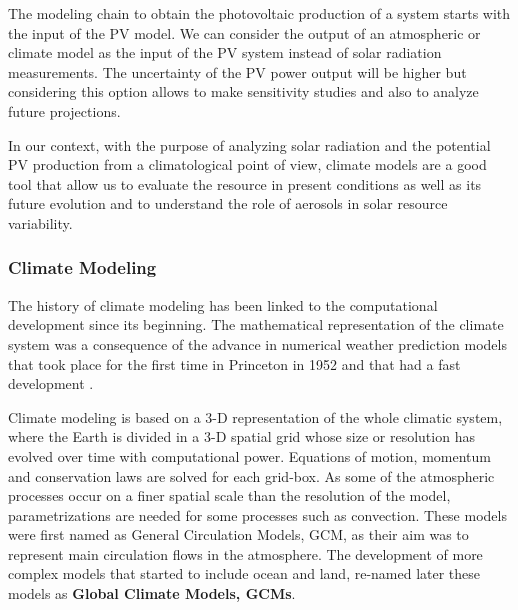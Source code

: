 The modeling chain to obtain the photovoltaic production of a system starts with the input of the PV model. We can consider the output of an atmospheric or climate model as the input of the PV system instead of solar radiation measurements. The uncertainty of the PV power output will be higher but considering this option allows to make sensitivity studies and also to analyze future projections.
 

In our context, with the purpose of analyzing solar radiation and the potential PV production from a climatological point of view, climate models are a good tool that allow us to evaluate the resource in present conditions as well as its future evolution and to understand the role of aerosols in solar resource variability.

\subsubsection{Climate Modeling}

The history of climate modeling has been linked to the computational development since its beginning. The mathematical representation of the climate system was a consequence of the advance in numerical weather prediction models that took place for the first time in Princeton in 1952 and that had a fast development \cite*{Edwards2011}. %

Climate modeling is based on a 3-D representation of the whole climatic system, where the Earth is divided  in a 3-D spatial grid whose size or resolution has evolved over time with computational power. Equations of motion, momentum and conservation laws are solved for each grid-box. As some of the atmospheric processes occur on a finer spatial scale than the resolution of the model, parametrizations are needed for some processes such as convection. These models were first named as General Circulation Models, GCM, as their aim was to represent main circulation flows in the atmosphere. The development of more complex models that started to include ocean and land, re-named later these models as \textbf{Global Climate Models, GCMs}. 

